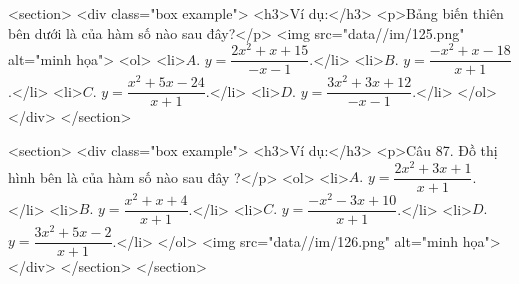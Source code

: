     <section>
        <div class="box example">
            <h3>Ví dụ:</h3>
            <p>Bảng biến thiên bên dưới là của hàm số nào sau đây?</p>
            <img src="data//im/125.png" alt="minh họa">
            <ol>
                <li>\(A.\) \(y = \dfrac{2x^2+x+15}{-x-1}\).</li>
                <li>\(B.\) \(y = \dfrac{-x^2+x-18}{x+1}\).</li>
                <li>\(C.\) \(y = \dfrac{x^2+5x-24}{x+1}\).</li>
                <li>\(D.\) \(y = \dfrac{3x^2+3x+12}{-x-1}\).</li>
            </ol>
        </div>
    </section>

    <section>
        <div class="box example">
            <h3>Ví dụ:</h3>
            <p>Câu 87. Đồ thị hình bên là của hàm số nào sau đây ?</p>
            <ol>
                <li>\(A.\) \(y = \dfrac{2x^2+3x+1}{x+1}\).</li>
                <li>\(B.\) \(y = \dfrac{x^2+x+4}{x+1}\).</li>
                <li>\(C.\) \(y = \dfrac{-x^2-3x+10}{x+1}\).</li>
                <li>\(D.\) \(y = \dfrac{3x^2+5x-2}{x+1}\).</li>
            </ol>
            <img src="data//im/126.png" alt="minh họa">
        </div>
    </section>
</section>